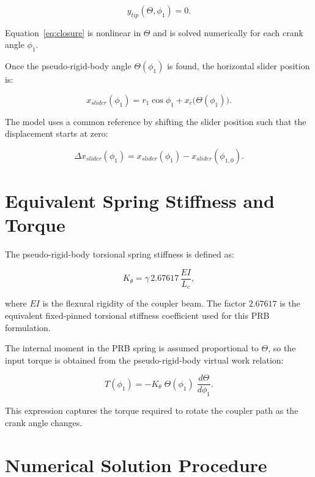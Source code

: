 \documentclass[11pt]{article}
\begin{document}
\begin{equation}
    y_{tip}(\Theta, \phi_1) = 0.
    \label{eq:closure}
\end{equation}

Equation~\eqref{eq:closure} is nonlinear in $\Theta$ and is solved numerically for each crank angle $\phi_1$.

Once the pseudo-rigid-body angle $\Theta(\phi_1)$ is found, the horizontal slider position is:

\begin{equation}
    x_{slider}(\phi_1) = r_1 \cos \phi_1 + x_c\bigl(\Theta(\phi_1)\bigr).
\end{equation}

The model uses a common reference by shifting the slider position such that the displacement starts at zero:

\begin{equation}
    \Delta x_{slider}(\phi_1) = x_{slider}(\phi_1) - x_{slider}(\phi_{1,0}).
\end{equation}

\section{Equivalent Spring Stiffness and Torque}

The pseudo-rigid-body torsional spring stiffness is defined as:

\begin{equation}
    K_{\theta} = \gamma \, 2.67617 \, \frac{EI}{L_c},
    \label{eq:Kt}
\end{equation}

where $EI$ is the flexural rigidity of the coupler beam. The factor $2.67617$ is the equivalent fixed-pinned torsional stiffness coefficient used for this PRB formulation.

The internal moment in the PRB spring is assumed proportional to $\Theta$, so the input torque is obtained from the pseudo-rigid-body virtual work relation:

\begin{equation}
    T(\phi_1) = -K_{\theta} \; \Theta(\phi_1) \; \frac{d\Theta}{d\phi_1}.
    \label{eq:torque}
\end{equation}

This expression captures the torque required to rotate the coupler path as the crank angle changes.

\section{Numerical Solution Procedure}
\end{document}
